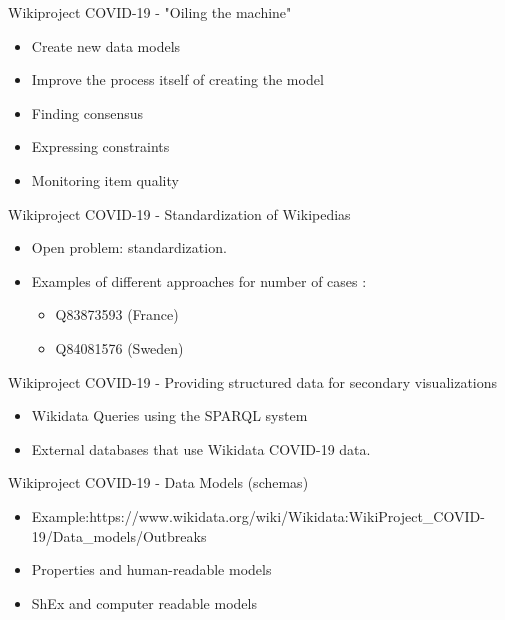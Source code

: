 \documentclass{beamer}
\begin{document}
\begin{frame}{Wikiproject COVID-19 - "Oiling the machine"}
\begin{itemize}
    \item Create new data models 
    \item Improve the process itself of creating the model
    \item Finding consensus
    \item Expressing constraints
    \item Monitoring item quality
\end{itemize}
\end{frame}

\begin{frame}{Wikiproject COVID-19 - Standardization of Wikipedias}

\begin{itemize}
    \item Open problem: standardization. 
    \item Examples of different approaches for number of cases :
    \begin{itemize}
        \item Q83873593 (France) 
        \item Q84081576 (Sweden)
    \end{itemize}
\end{itemize}
\end{frame}

\begin{frame}{Wikiproject COVID-19 - Providing structured data for secondary visualizations}
\begin{itemize}
    \item Wikidata Queries using the SPARQL system 
    \item External databases that use Wikidata COVID-19 data.
\end{itemize}
\end{frame}



\begin{frame}{Wikiproject COVID-19 - Data Models (schemas) }
\begin{itemize}
    \item Example:https://www.wikidata.org/wiki/Wikidata:WikiProject\_COVID-19/Data\_models/Outbreaks
    \item Properties and human-readable models
    \item ShEx and computer readable models
\end{itemize}
\end{frame}
\end{document}
